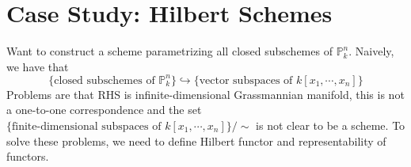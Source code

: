 \documentclass{ctexart}
\begin{document}
\section{Case Study: Hilbert Schemes}
\label{section:Case Study: Hilbert Schemes}

Want to construct a scheme parametrizing all closed subschemes of $\mathbb{P}_{k}^{n}$.
Naively, we have that 
\begin{equation*}
    \{\text{closed subschemes of $\mathbb{P}_{k}^{n}$}\} \hookrightarrow \{\text{vector subspaces of $k[x_{1}, \cdots, x_{n}]$}\}
\end{equation*}
Problems are that RHS is infinite-dimensional Grassmannian manifold, this is not a one-to-one correspondence and the set $\{\text{finite-dimensional subspaces of $k[x_{1}, \cdots, x_{n}]$}\}/\sim$ is not clear to be a scheme.
To solve these problems, we need to define Hilbert functor and representability of functors.
\end{document}
